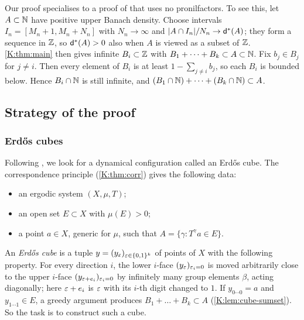 \begin{remark}\label{K:rem:N}
Our proof specialises to a proof of \cite[Theorem~1.1]{kra2022infinite} that uses no
pronilfactors.
To see this, let $A\subset\mathbb{N}$ have positive upper Banach density.
Choose intervals $I_n=[M_n+1,M_n+N_n]$ with $N_n\to\infty$ and
$|A\cap I_n|/N_n\to\mathsf{d}^*(A)$; they form a \Fol{} sequence in $\mathbb{Z}$, so $\mathsf{d}^*(A)>0$ also when $A$
is viewed as a subset of $\mathbb{Z}$.
\cref{K:thm:main} then gives infinite $B_i\subset\mathbb{Z}$ with $B_1+\dots+B_k\subset A\subset\mathbb{N}$.
Fix $b_j\in B_j$ for $j\neq i$. Then every element of $B_i$ is at least
$1-\sum_{j\ne i}b_j$, so each $B_i$ is bounded below.
Hence $B_i\cap\mathbb{N}$ is still infinite, and $(B_1\cap\mathbb{N})+\dots+(B_k\cap\mathbb{N})\subset A$.
\end{remark}

\subsection{Strategy of the proof}\label{K:ssec:strategy}

\subsubsection*{Erdős cubes}
Following \cite{kra2022infinite}, we look for a dynamical configuration called an Erdős cube.
The correspondence principle (\cref{K:thm:corr}) gives the following data:
\begin{itemize}
\item an ergodic system $(X,\mu,T)$;
\item an open set $E\subset X$ with $\mu(E)>0$;
\item a point $a\in X$, generic for $\mu$, such that $A=\{\gamma:T^\gamma a\in E\}$.
\end{itemize}
An \emph{Erdős cube} is a tuple $y=(y_\varepsilon)_{\varepsilon\in\{0,1\}^k}$ of points of $X$ with the
following property. For every direction $i$, the lower $i$-face
$(y_\varepsilon)_{\varepsilon_i=0}$ is moved arbitrarily close to the upper $i$-face
$(y_{\varepsilon+e_i})_{\varepsilon_i=0}$ by infinitely many group elements $\beta$, acting diagonally;
here $\varepsilon+e_i$ is $\varepsilon$ with its $i$-th digit changed to $1$.
If $y_{0\cdots0}=a$ and $y_{1\cdots1}\in E$, a greedy argument produces
$B_1+\dots+B_k\subset A$ (\cref{K:lem:cube-sumset}).
So the task is to construct such a cube.

